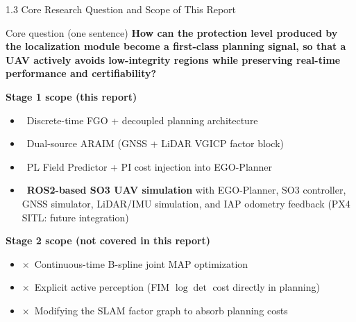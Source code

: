 \documentclass[10pt,aspectratio=169,xcolor=dvipsnames]{beamer}
\newcommand{\1}{\mathbb{1}}
\newcommand{\innov}[1]{\textcolor{NavyBlue}{\textbf{#1}}}
\begin{document}
\begin{frame}{1.3 Core Research Question and Scope of This Report}
  \begin{alertblock}{Core question (one sentence)}
    \textbf{How can the protection level produced by the localization module become a first-class planning signal, so that a UAV actively avoids low-integrity regions while preserving real-time performance and certifiability?}
  \end{alertblock}

  \vspace{8pt}
  \textbf{Stage 1 scope (this report)}
  \begin{itemize}\small
    \item \checkmark~Discrete-time FGO + decoupled planning architecture
    \item \checkmark~Dual-source ARAIM (GNSS + LiDAR VGICP factor block)
    \item \checkmark~PL Field Predictor + PI cost injection into EGO-Planner
    \item \checkmark~\innov{ROS2-based SO3 UAV simulation} with EGO-Planner, SO3 controller, GNSS simulator, LiDAR/IMU simulation, and IAP odometry feedback (PX4 SITL: future integration)
  \end{itemize}

  \textbf{Stage 2 scope (not covered in this report)}
  \begin{itemize}\small
    \item \(\times\)~Continuous-time B-spline joint MAP optimization
    \item \(\times\)~Explicit active perception (FIM \(\log\det\) cost directly in planning)
    \item \(\times\)~Modifying the SLAM factor graph to absorb planning costs
  \end{itemize}
\end{frame}
\end{document}
